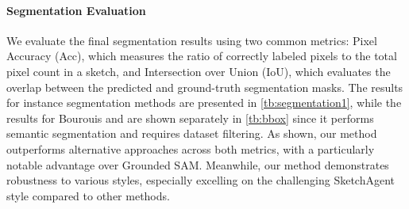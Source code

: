 \paragraph{Segmentation Evaluation}
We evaluate the final segmentation results using two common metrics: Pixel Accuracy (Acc), which measures the ratio of correctly labeled pixels to the total pixel count in a sketch, and  Intersection over Union (IoU), which evaluates the overlap between the predicted and ground-truth segmentation masks. The results for instance segmentation methods are presented in \cref{tb:segmentation1}, while the results for Bourouis \etal {} and  are shown separately in \cref{tb:bbox} since it performs semantic segmentation and requires dataset filtering. 
As shown, our method outperforms alternative approaches across both metrics, with a particularly notable advantage over Grounded SAM.  Meanwhile, our method demonstrates robustness to various styles, especially excelling on the challenging  SketchAgent style compared to other methods. 

